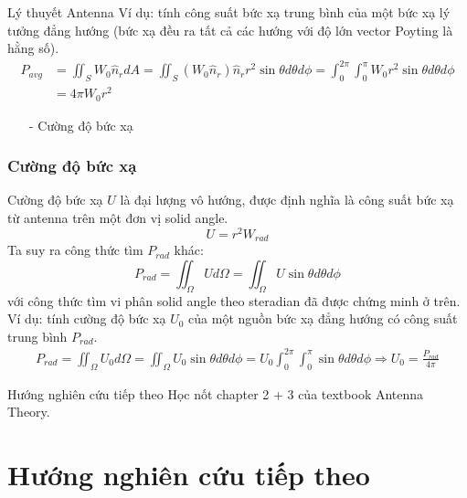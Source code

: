 \documentclass[8pt]{beamer}
\begin{document}
\begin{frame}{Lý thuyết Antenna}
Ví dụ: tính công suất bức xạ trung bình của một bức xạ lý tưởng đẳng hướng (bức xạ đều ra tất cả các hướng với độ lớn vector Poyting là hằng số).
\begin{equation*}
\begin{split}
	P_{avg}&=\iint_{S}W_{0}\hat n_{r} dA=\iint_{S}(W_{0}\hat n_{r}) \hat n_{r}r^2\sin{\theta}d\theta d\phi=\int_{0}^{2\pi}\int_{0}^{\pi}W_{0}r^2\sin{\theta}d\theta d\phi \\
	       &=4\pi W_{0}r^2
\end{split}
\end{equation*}
\begin{itemize}
	\item[-] Cường độ bức xạ
\end{itemize}
\subsubsection{Cường độ bức xạ}
Cường độ bức xạ $U$ là đại lượng vô hướng, được định nghĩa là công suất bức xạ từ antenna trên một đơn vị solid angle. $$U=r^2W_{rad}$$ Ta suy ra công thức tìm $P_{rad}$ khác:
$$P_{rad}=\iint_{\Omega}Ud\Omega=\iint_{\Omega}U\sin{\theta}d\theta d\phi$$
với công thức tìm vi phân solid angle theo steradian đã được chứng minh ở trên.
\\ Ví dụ: tính cường độ bức xạ $U_{0}$ của một nguồn bức xạ đẳng hướng có công suất trung bình $P_{rad}$.
 \begin{equation*}
\begin{split}
	P_{rad}=\iint_{\Omega}U_{0}d\Omega=\iint_{\Omega}U_{0}\sin{\theta}d\theta d\phi=U_{0}\int_{0}^{2\pi}\int_{0}^{\pi}\sin{\theta}d\theta d\phi \Rightarrow U_{0}=\frac{P_{rad}}{4\pi}
\end{split}
\end{equation*}

\end{frame}

\begin{frame}{Hướng nghiên cứu tiếp theo}
Học nốt chapter 2 + 3 của textbook Antenna Theory.
\section{Hướng nghiên cứu tiếp theo}
\end{frame}
\end{document}

